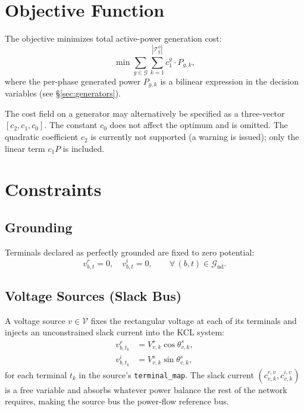 \documentclass[11pt,a4paper]{article}
\newcommand{\mc}[1]{\mathcal{#1}}
\newcommand{\vr}[2]{v^r_{#1,#2}}
\newcommand{\vi}[2]{v^i_{#1,#2}}
\begin{document}
\section{Objective Function}

The objective minimizes total active-power generation cost:
%
\begin{equation}
  \min \sum_{g\in\mc{G}} \sum_{k=1}^{|\mc{T}_g^\phi|}
    c^g_1 \cdot P_{g,k},
\end{equation}
%
where the per-phase generated power $P_{g,k}$ is a bilinear expression in
the decision variables (see \S\ref{sec:generators}).

The cost field on a generator may alternatively be specified as a three-vector
$[c_2, c_1, c_0]$.  The constant $c_0$ does not affect the optimum and is
omitted.  The quadratic coefficient $c_2$ is currently not supported (a warning
is issued); only the linear term $c_1 P$ is included.

\section{Constraints}

\subsection{Grounding}

Terminals declared as perfectly grounded are fixed to zero potential:
%
\begin{equation}
  \vr{b}{t} = 0,\quad \vi{b}{t} = 0, \qquad \forall\,(b,t)\in\mc{G}_\text{nd}.
\end{equation}

\subsection{Voltage Sources (Slack Bus)}

A voltage source $v\in\mc{V}$ fixes the rectangular voltage at each of its
terminals and injects an unconstrained slack current into the KCL system:
%
\begin{align}
  \vr{b}{t_k} &= V^s_{v,k}\cos\theta^s_{v,k}, \\
  \vi{b}{t_k} &= V^s_{v,k}\sin\theta^s_{v,k},
\end{align}
%
for each terminal $t_k$ in the source's \texttt{terminal\_map}.  The slack
current $(c^{r,v}_{v,k}, c^{i,v}_{v,k})$ is a free variable and absorbs
whatever power balance the rest of the network requires, making the source bus
the power-flow reference bus.
\end{document}
